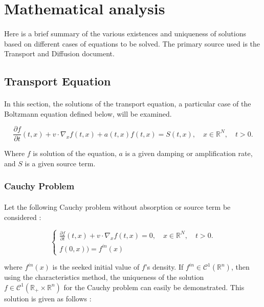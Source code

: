 \documentclass[a4paper, 11pt]{article}
\begin{document}
\section{Mathematical analysis}

\paragraph{} Here is a brief summary of the various existences and uniqueness of solutions based on different cases of equations to be solved. The primary source used is the Transport and Diffusion \cite{allaire:2019} document.

\subsection{Transport Equation}

\paragraph{}
In this section, the solutions of the transport equation, a particular case of the Boltzmann equation defined below, will be examined.


\begin{equation} \label{transport}
\frac{\partial f}{\partial t}(t,x)+v \cdot \nabla_x f(t,x) + a(t,x)f(t,x) = S(t,x), \quad x \in \mathbb{R}^N, \quad t>0.
\end{equation}


Where $f$ is solution of the equation, $a$ is a given damping or amplification rate, and $S$ is a given source term.

\subsubsection{Cauchy Problem}
\paragraph{}

Let the following Cauchy problem without absorption or source term be considered :


\[
\begin{cases}
\frac{\partial f}{\partial t}(t,x)+v \cdot \nabla_x f(t,x)=0, \quad x \in \mathbb{R}^N, \quad t>0.\\
f(0,x)) = f^{in}(x)
\end{cases}
\]

where $f^{in}(x)$ is the seeked initial value of $f$'s density. If $f^{in} \in \mathcal{C}^1(\mathbb{R}^n)$, then using the characteristics method, the uniqueness of the solution $f \in \mathcal{C}^1(\mathbb{R}_+ \times \mathbb{R}^n)$ for the Cauchy problem can easily be demonstrated. This solution is given as follows :
\end{document}
